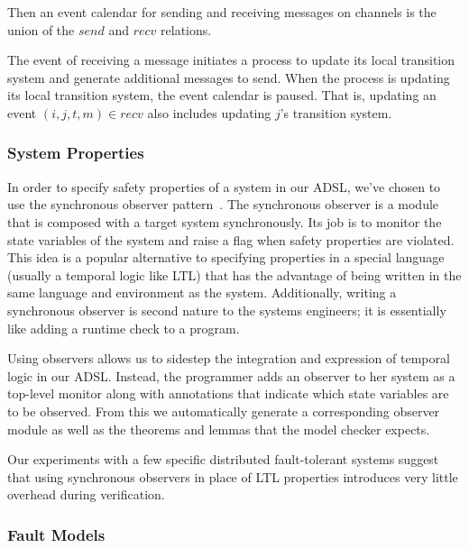 Then an event calendar for sending and receiving messages on channels is
the union of the $send$ and $recv$ relations.

The event of receiving a message initiates a process to update its local
transition system and generate additional messages to send. When the
process is updating its local transition system, the event calendar is
paused. That is, updating an event $(i, j, t, m) \in recv$ also includes
updating $j$'s transition system.



\subsubsection{System Properties}
\label{ssec:lima-properties}

In order to specify safety properties of a system in our ADSL, we've chosen to
use the synchronous observer pattern~\cite{Rushby-2012}. The synchronous
observer is a module that is composed with a target system synchronously. Its
job is to monitor the state variables of the system and raise a flag when
safety properties are violated. This idea is a popular alternative to
specifying properties in a special language (usually a temporal logic like
LTL) that has the advantage of being written in the same language and
environment as the system. Additionally, writing a synchronous observer is
second nature to the systems engineers; it is essentially like adding a runtime
check to a program.

Using observers allows us to sidestep the integration and expression of
temporal logic in our ADSL. Instead, the programmer adds an observer to her
system as a top-level monitor along with annotations that indicate which state
variables are to be observed.  From this we automatically generate a
corresponding observer module as well as the theorems and lemmas that the
model checker expects.

Our experiments with a few specific distributed fault-tolerant systems suggest
that using synchronous observers in place of LTL properties introduces very
little overhead during verification.



\subsubsection{Fault Models}\label{ssec:fault-models}

